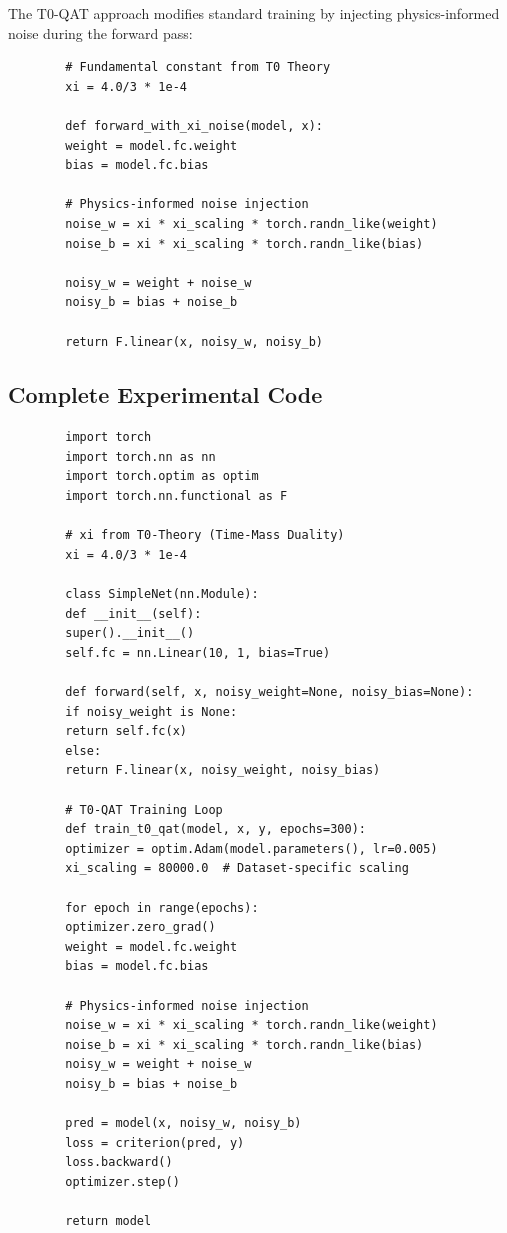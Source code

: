 	The T0-QAT approach modifies standard training by injecting physics-informed noise during the forward pass:
	
	\begin{verbatim}
		# Fundamental constant from T0 Theory
		xi = 4.0/3 * 1e-4
		
		def forward_with_xi_noise(model, x):
		weight = model.fc.weight
		bias = model.fc.bias
		
		# Physics-informed noise injection
		noise_w = xi * xi_scaling * torch.randn_like(weight)
		noise_b = xi * xi_scaling * torch.randn_like(bias)
		
		noisy_w = weight + noise_w
		noisy_b = bias + noise_b
		
		return F.linear(x, noisy_w, noisy_b)
	\end{verbatim}
	
	\subsection{Complete Experimental Code}
	
	\begin{verbatim}
		import torch
		import torch.nn as nn
		import torch.optim as optim
		import torch.nn.functional as F
		
		# xi from T0-Theory (Time-Mass Duality)
		xi = 4.0/3 * 1e-4
		
		class SimpleNet(nn.Module):
		def __init__(self):
		super().__init__()
		self.fc = nn.Linear(10, 1, bias=True)
		
		def forward(self, x, noisy_weight=None, noisy_bias=None):
		if noisy_weight is None:
		return self.fc(x)
		else:
		return F.linear(x, noisy_weight, noisy_bias)
		
		# T0-QAT Training Loop
		def train_t0_qat(model, x, y, epochs=300):
		optimizer = optim.Adam(model.parameters(), lr=0.005)
		xi_scaling = 80000.0  # Dataset-specific scaling
		
		for epoch in range(epochs):
		optimizer.zero_grad()
		weight = model.fc.weight
		bias = model.fc.bias
		
		# Physics-informed noise injection
		noise_w = xi * xi_scaling * torch.randn_like(weight)
		noise_b = xi * xi_scaling * torch.randn_like(bias)
		noisy_w = weight + noise_w
		noisy_b = bias + noise_b
		
		pred = model(x, noisy_w, noisy_b)
		loss = criterion(pred, y)
		loss.backward()
		optimizer.step()
		
		return model
	\end{verbatim}
	
